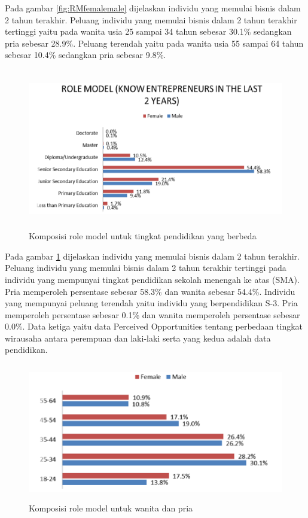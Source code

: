 \documentclass[a4paper,twoside]{article}
\begin{document}
\begin{enumerate}
Pada gambar \ref{fig:RMfemalemale} dijelaskan individu yang memulai bisnis dalam 2 tahun terakhir. Peluang individu yang memulai bisnis dalam 2 tahun terakhir tertinggi yaitu pada wanita usia 25 sampai 34 tahun sebesar 30.1\% sedangkan pria sebesar 28.9\%. Peluang terendah yaitu pada wanita usia 55 sampai 64 tahun sebesar 10.4\% sedangkan pria sebesar 9.8\%.


\begin{figure} [H]
	\centering  
	\includegraphics[width=13cm, height=7cm]{RMpendidikan} 
	\caption[Komposisi role model untuk tingkat pendidikan yang berbeda]{Komposisi role model untuk tingkat pendidikan yang berbeda} 
	\label{fig:RMpendidikan} 
\end{figure}  


Pada gambar \ref{fig:RMpendidikan} dijelaskan individu yang memulai bisnis dalam 2 tahun terakhir. Peluang individu yang memulai bisnis dalam 2 tahun terakhir tertinggi pada individu yang mempunyai tingkat pendidikan sekolah menengah ke atas (SMA). Pria memperoleh persentase sebesar 58.3\% dan wanita sebesar 54.4\%. Individu yang mempunyai peluang terendah yaitu individu yang berpendidikan S-3. Pria memperoleh persentase sebesar 0.1\% dan wanita memperoleh persentase sebesar 0.0\%. Data ketiga yaitu data Perceived Opportunities tentang perbedaan tingkat wirausaha antara perempuan dan laki-laki serta yang kedua adalah data pendidikan.

\begin{figure} [H]
	\centering  
	\includegraphics[width=12cm, height=6cm]{POfemalemale} 
	\caption[Komposisi role model untuk wanita dan pria]{Komposisi role model untuk wanita dan pria} 
	\label{fig:POfemalemale} 
\end{figure} 


\end{enumerate}
\end{document}
